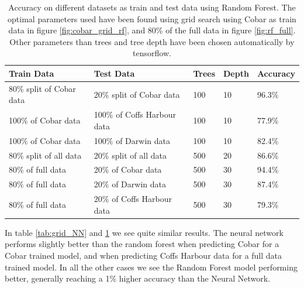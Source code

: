 \documentclass[11pt]{article}
\begin{document}
\begin{table}[H]
    \caption{Accuracy on different datasets as train and test data using Random Forest. The optimal parameters used have been found using grid search using Cobar as train data in figure \ref{fig:cobar_grid_rf}, and 80\% of the full data in figure \ref{fig:rf_full}. Other parameters than trees and tree depth have been chosen automatically by tensorflow.}
    \label{tab:grid_RF}
    \centering
    \begin{tabular}{|l|l|l|l|l|}
        \hline
        \textbf{Train Data}      & \textbf{Test Data}          & \textbf{Trees} & \textbf{Depth} & \textbf{Accuracy} \\
        \hline
        80\% split of Cobar data & 20\% split of Cobar data    & 100            & 10             & 96.3\%            \\
        \hline
        100\% of Cobar data      & 100\% of Coffs Harbour data & 100            & 10             & 77.9\%            \\
        \hline
        100\% of Cobar data      & 100\% of Darwin data        & 100            & 10             & 82.4\%            \\
        \hline
        80\% split of all data   & 20\% split of all data      & 500            & 20             & 86.6\%            \\
        \hline
        80\% of full data        & 20\% of Cobar data          & 500            & 30             & 94.4\%            \\
        \hline
        80\% of full data        & 20\% of Darwin data         & 500            & 30             & 87.4\%            \\
        \hline
        80\% of full data        & 20\% of Coffs Harbour data  & 500            & 30             & 79.3\%            \\
        \hline
    \end{tabular}
\end{table}
In table \ref{tab:grid_NN} and \ref{tab:grid_RF} we see quite similar results. The neural network performs slightly better than the random forest when predicting Cobar for a Cobar trained model, and when predicting Coffs Harbour data for a full data trained model. In all the other cases we see the Random Forest model performing better, generally reaching a 1\% higher accuracy than the Neural Network.
\end{document}

